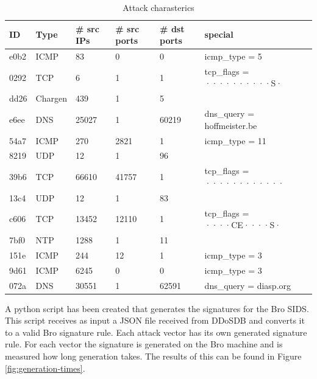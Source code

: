 \begin{table}[H]
\centering
\begin{tabular}{l | l | l | l | l | l}
ID & Type & \# src IPs & \# src ports & \# dst ports & special  \\ \hline \hline
e0b2 & ICMP & 83 & 0 & 0 & icmp\_type = 5 \\ \hline
0292 & TCP & 6 & 1 & 1 & tcp\_flags = ··········S· \\ \hline
dd26 & Chargen & 439 & 1 & 5 &  \\ \hline
e6ee & DNS & 25027 & 1 & 60219 & dns\_query = hoffmeister.be \\ \hline
54a7 & ICMP & 270 & 2821 & 1 & icmp\_type = 11 \\ \hline
8219 & UDP & 12 & 1 & 96 &  \\ \hline
39b6 & TCP & 66610 & 41757 & 1 & tcp\_flags = ············ \\ \hline
13c4 & UDP & 12 & 1 & 83 &  \\ \hline
c606 & TCP & 13452 & 12110 & 1 & tcp\_flags = ····CE····S· \\ \hline
7bf0 & NTP & 1288 & 1 & 11 &  \\ \hline
151e & ICMP & 244 & 12 & 1 & icmp\_type = 3 \\ \hline
9d61 & ICMP & 6245 & 0 & 0 & icmp\_type = 3 \\ \hline
072a & DNS & 30551 & 1 & 62591 & dns\_query = diasp.org
\end{tabular}
\caption{\label{tab:json-summarry}Attack charasterics}
\end{table}

A python script has been created that generates the signatures for the Bro SIDS. This script receives as input a JSON file received from DDoSDB and converts it to a valid Bro signature rule. Each attack vector has its own generated signature rule. For each vector the signature is generated on the Bro machine and is measured how long generation takes. The results of this can be found in Figure \ref{fig:generation-times}.

